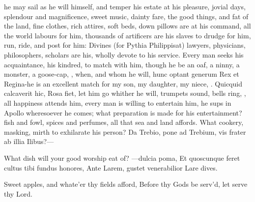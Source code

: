 {{he may sail as he will himself, and temper his estate at his pleasure,
jovial days, splendour and magnificence, sweet music, dainty fare, the
good things, and fat of the land, fine clothes, rich attires, soft
beds, down pillows are at his command, all the world labours for him,
thousands of artificers are his slaves to drudge for him, run, ride,
and post for him: Divines (for Pythia Philippisat) lawyers,
physicians, philosophers, scholars are his, wholly devote to his
service. Every man seeks his acquaintance, his kindred, to match
with him, though he be an oaf, a ninny, a monster, a goose-cap, , when, and whom he will, hunc optant generum Rex et
Regina-he is an excellent match for my son, my daughter, my
niece, \etc{}. Quicquid calcaverit hic, Rosa fiet, let him go whither he
will, trumpets sound, bells ring, \etc{}, all happiness attends him, every
man is willing to entertain him, he sups in Apollo wheresoever he
comes; what preparation is made for his entertainment? fish and
fowl, spices and perfumes, all that sea and land affords. What cookery,
masking, mirth to exhilarate his person?
Da Trebio, pone ad Trebium, vis frater ab illia
Ilibus?---

What dish will your good worship eat of?
---dulcia poma,
Et quoscunque feret cultus tibi fundus honores,
Ante Larem, gustet venerabilior Lare dives.

Sweet apples, and whate'er thy fields afford,
Before thy Gods be serv'd, let serve thy Lord.

}}
